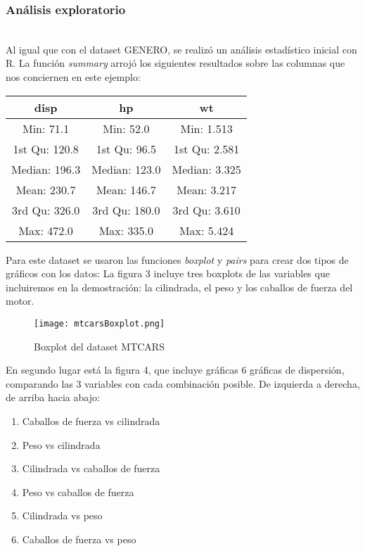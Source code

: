 \documentclass[sigconf,authorversion,nonacm]{acmart}
\begin{document}
\subsubsection{Análisis exploratorio}\hfill\\
Al igual que con el dataset GENERO, se realizó un análisis estadístico inicial con R. La función \textit{summary} arrojó los siguientes resultados sobre las columnas que nos conciernen en este ejemplo:
\begin{center}
\begin{tabular}{ |c|c|c| }
  \hline
  disp & hp & wt \\
  \hline
  Min: 71.1 & Min: 52.0 & Min: 1.513 \\
  1st Qu: 120.8 & 1st Qu: 96.5 & 1st Qu: 2.581 \\
  Median: 196.3 & Median: 123.0 & Median: 3.325 \\
  Mean: 230.7 & Mean: 146.7 & Mean: 3.217 \\
  3rd Qu: 326.0 & 3rd Qu: 180.0 & 3rd Qu: 3.610 \\
  Max: 472.0 & Max: 335.0 & Max: 5.424 \\
  \hline
\end{tabular}
\end{center}

Para este dataset se usaron las funciones \textit{boxplot} y \textit{pairs} para crear dos tipos de gráficos con los datos:
La figura 3 incluye tres boxplots de las variables que incluiremos en la demostración: la cilindrada, el peso y los caballos de fuerza del motor.

\begin{figure}[H]
  \centering
  \texttt{[image: mtcarsBoxplot.png]}
  \caption{Boxplot del dataset MTCARS}
\end{figure}

En segundo lugar está la figura 4, que incluye gráficas 6 gráficas de dispersión, comparando las 3 variables con cada combinación posible. De izquierda a derecha, de arriba hacia abajo:

\begin{enumerate}
  \item Caballos de fuerza vs cilindrada
  \item Peso vs cilindrada
  \item Cilindrada vs caballos de fuerza
  \item Peso vs caballos de fuerza
  \item Cilindrada vs peso
  \item Caballos de fuerza vs peso
\end{enumerate}
\end{document}
